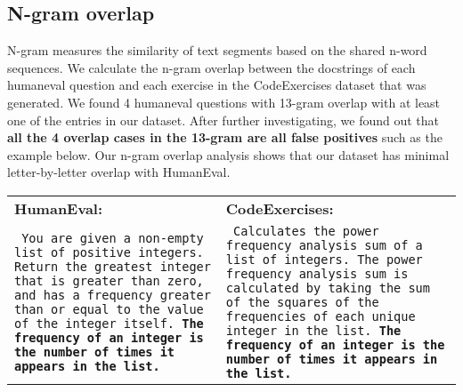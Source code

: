 \subsection{N-gram overlap}
N-gram measures the similarity of text segments based on the shared n-word sequences. We calculate the n-gram overlap between the docstrings of each humaneval question and each exercise in the CodeExercises dataset that was generated. We found 4 humaneval questions with 13-gram overlap with at least one of the entries in our dataset.
After further investigating, we found out that \textbf{all the 4 overlap cases in the 13-gram are all false positives} such as the example below. Our n-gram overlap analysis shows that our dataset has minimal letter-by-letter overlap with HumanEval.  

\begin{AIbox}{}\hspace{-7pt}
\begin{tabular}{p{}p{}}
\textbf{HumanEval:} & \textbf{CodeExercises:}\\

{\tt\scriptsize
You are given a non-empty list of positive integers. Return the greatest integer that is greater than zero, and has a frequency greater than or equal to the value of the integer itself. \bf{The frequency of an integer is the number of times it appears in the list.}
}
&
{\tt\scriptsize
Calculates the power frequency analysis sum of a list of integers. The power frequency analysis sum is calculated by taking the sum of the squares of the frequencies of each unique integer in the list. \bf{The frequency of an integer is the number of times it appears in the list.}
}
\end{tabular}
\end{AIbox}

